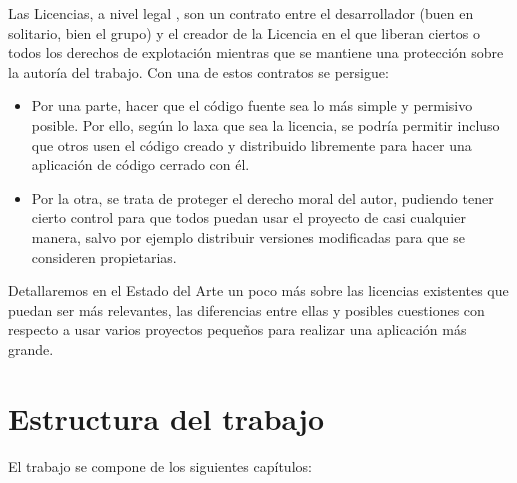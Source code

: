 Las Licencias, a nivel legal\cite{fsfe-licensing} , son un contrato entre el desarrollador (buen en solitario, bien el grupo) y el creador de la Licencia en el que liberan ciertos o todos los derechos de explotación mientras que se mantiene una protección sobre la autoría del trabajo. Con una de estos contratos se persigue:
\begin{itemize}
	\item Por una parte, hacer que el código fuente sea lo más simple y permisivo posible. Por ello, según lo laxa que sea la licencia, se podría permitir incluso que otros usen el código creado y distribuido libremente para hacer una aplicación de código cerrado con él.
	\item Por la otra, se trata de proteger el derecho moral del autor, pudiendo tener cierto control para que todos puedan usar el proyecto de casi cualquier manera, salvo por ejemplo distribuir versiones modificadas para que se consideren propietarias.
\end{itemize}



Detallaremos en el Estado del Arte un poco más sobre las licencias existentes que puedan ser más relevantes, las diferencias entre ellas y posibles cuestiones con respecto a usar varios proyectos pequeños para realizar una aplicación más grande.

\section{Estructura del trabajo}

El trabajo se compone de los siguientes capítulos:

